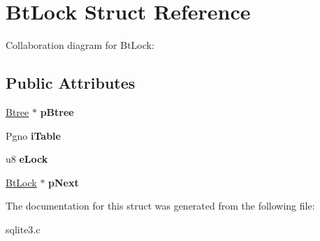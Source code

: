 \hypertarget{structBtLock}{}\section{Bt\+Lock Struct Reference}
\label{structBtLock}


Collaboration diagram for Bt\+Lock\+:
\subsection*{Public Attributes}
\begin{DoxyCompactItemize}
\item 
\hyperlink{structBtree}{Btree} $\ast$ {\bfseries p\+Btree}\hypertarget{structBtLock_ab9125b8e79d480b75f3af21cb2ab55c7}{}\label{structBtLock_ab9125b8e79d480b75f3af21cb2ab55c7}

\item 
Pgno {\bfseries i\+Table}\hypertarget{structBtLock_a822efcf018d6c8eb343341cde5df980d}{}\label{structBtLock_a822efcf018d6c8eb343341cde5df980d}

\item 
u8 {\bfseries e\+Lock}\hypertarget{structBtLock_abe07b71018ee423e0d94b5cdba044b5c}{}\label{structBtLock_abe07b71018ee423e0d94b5cdba044b5c}

\item 
\hyperlink{structBtLock}{Bt\+Lock} $\ast$ {\bfseries p\+Next}\hypertarget{structBtLock_ad42de86209c7aab43604c52a549b7bca}{}\label{structBtLock_ad42de86209c7aab43604c52a549b7bca}

\end{DoxyCompactItemize}


The documentation for this struct was generated from the following file\+:\begin{DoxyCompactItemize}
\item 
sqlite3.\+c\end{DoxyCompactItemize}
